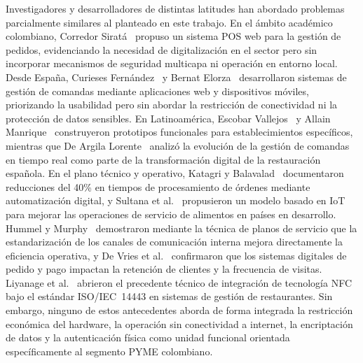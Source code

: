Investigadores y desarrolladores de distintas latitudes han abordado problemas 
parcialmente similares al planteado en este trabajo. En el ámbito académico colombiano, 
Corredor Siratá~\cite{Documento2022} propuso un sistema POS web para la gestión de 
pedidos, evidenciando la necesidad de digitalización en el sector pero sin incorporar 
mecanismos de seguridad multicapa ni operación en entorno local. Desde España, Curieses 
Fernández~\cite{Curieses2023} y Bernat Elorza~\cite{Bernat2023} desarrollaron sistemas 
de gestión de comandas mediante aplicaciones web y dispositivos móviles, priorizando la 
usabilidad pero sin abordar la restricción de conectividad ni la protección de datos 
sensibles. En Latinoamérica, Escobar Vallejos~\cite{Escobar2023} y Allain 
Manrique~\cite{Allain2020} construyeron prototipos funcionales para establecimientos 
específicos, mientras que De Argila Lorente~\cite{deArgila2024} analizó la evolución 
de la gestión de comandas en tiempo real como parte de la transformación digital de la 
restauración española. En el plano técnico y operativo, Katagri y 
Balavalad~\cite{Katagri2025} documentaron reducciones del 40\% en tiempos de 
procesamiento de órdenes mediante automatización digital, y Sultana et 
al.~\cite{Sultana2024} propusieron un modelo basado en IoT para mejorar las operaciones 
de servicio de alimentos en países en desarrollo. Hummel y Murphy~\cite{EmilyHummel} 
demostraron mediante la técnica de planos de servicio que la estandarización de los 
canales de comunicación interna mejora directamente la eficiencia operativa, y De Vries 
et al.~\cite{DEVRIES201859} confirmaron que los sistemas digitales de pedido y pago 
impactan la retención de clientes y la frecuencia de visitas. Liyanage 
et al.~\cite{Liyanage2018} abrieron el precedente técnico de integración de tecnología 
NFC bajo el estándar ISO/IEC~14443 en sistemas de gestión de restaurantes. Sin embargo, 
ninguno de estos antecedentes aborda de forma integrada la restricción económica del 
hardware, la operación sin conectividad a internet, la encriptación de datos y la 
autenticación física como unidad funcional orientada específicamente al segmento PYME 
colombiano.

